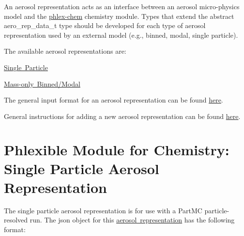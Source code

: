 An aerosol representation acts as an interface between an aerosol micro-\/physics model and the \mbox{\hyperlink{phlex_chem}{phlex-\/chem}} chemistry module. Types that extend the abstract {\ttfamily aero\+\_\+rep\+\_\+data\+\_\+t} type should be developed for each type of aerosol representation used by an external model (e.\+g., binned, modal, single particle).

The available aerosol representations are\+:
\begin{DoxyItemize}
\item \mbox{\hyperlink{phlex_aero_rep_single_particle}{Single Particle}}
\item \mbox{\hyperlink{phlex_aero_rep_modal_binned_mass}{Mass-\/only Binned/\+Modal}}
\end{DoxyItemize}

The general input format for an aerosol representation can be found \mbox{\hyperlink{input_format_aero_rep}{here}}.

General instructions for adding a new aerosol representation can be found \mbox{\hyperlink{phlex_aero_rep_add}{here}}. \hypertarget{phlex_aero_rep_single_particle}{}\section{Phlexible Module for Chemistry\+: Single Particle Aerosol Representation}\label{phlex_aero_rep_single_particle}
The single particle aerosol representation is for use with a Part\+MC particle-\/resolved run. The {\ttfamily json} object for this \mbox{\hyperlink{phlex_aero_rep}{aerosol representation}} has the following format\+:


